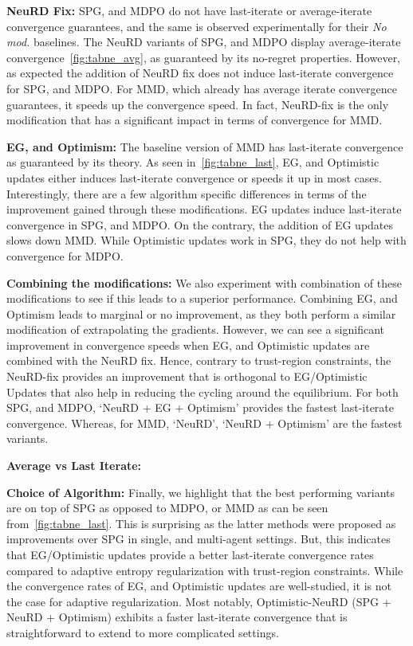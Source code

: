 \textbf{NeuRD Fix:}
SPG, and MDPO do not have last-iterate or average-iterate convergence guarantees, and the same is
observed experimentally for their \textit{No mod.
} baselines.
The NeuRD variants of SPG, and MDPO display average-iterate convergence~\ref{fig:tabne_avg}, as
guaranteed by its no-regret properties.
However, as expected the addition of NeuRD fix does not induce last-iterate convergence for SPG,
and MDPO.
For MMD, which already has average iterate convergence guarantees, it speeds up the convergence
speed.
In fact, NeuRD-fix is the only modification that has a significant impact in terms of convergence
for MMD.

\textbf{EG, and Optimism:}
The baseline version of MMD has last-iterate convergence as guaranteed by its theory.
As seen in~\ref{fig:tabne_last}, EG, and Optimistic updates either induces last-iterate convergence
or speeds it up in most cases.
Interestingly, there are a few algorithm specific differences in terms of the improvement gained
through these modifications.
EG updates induce last-iterate convergence in SPG, and MDPO.
On the contrary, the addition of EG updates slows down MMD.
While Optimistic updates work in SPG, they do not help with convergence for MDPO.

\textbf{Combining the modifications:}
We also experiment with combination of these modifications to see if this leads to a superior
performance.
Combining EG, and Optimism leads to marginal or no improvement, as they both perform a similar
modification of extrapolating the gradients.
However, we can see a significant improvement in convergence speeds when EG, and Optimistic updates
are combined with the NeuRD fix.
Hence, contrary to trust-region constraints, the NeuRD-fix provides an improvement that is
orthogonal to EG/Optimistic Updates that also help in reducing the cycling around the equilibrium.
For both SPG, and MDPO, `NeuRD + EG + Optimism' provides the fastest last-iterate convergence.
Whereas, for MMD, `NeuRD', `NeuRD + Optimism' are the fastest variants.

\textbf{Average vs Last Iterate:}

\textbf{Choice of Algorithm:}
Finally, we highlight that the best performing variants are on top of SPG as opposed to MDPO, or
MMD as can be seen from~\ref{fig:tabne_last}.
This is surprising as the latter methods were proposed as improvements over SPG in single, and
multi-agent settings.
But, this indicates that EG/Optimistic updates provide a better last-iterate convergence rates
compared to adaptive entropy regularization with trust-region constraints.
While the convergence rates of EG, and Optimistic updates are well-studied, it is not the case for
adaptive regularization.
Most notably, Optimistic-NeuRD (SPG + NeuRD + Optimism) exhibits a faster last-iterate convergence
that is straightforward to extend to more complicated settings.

